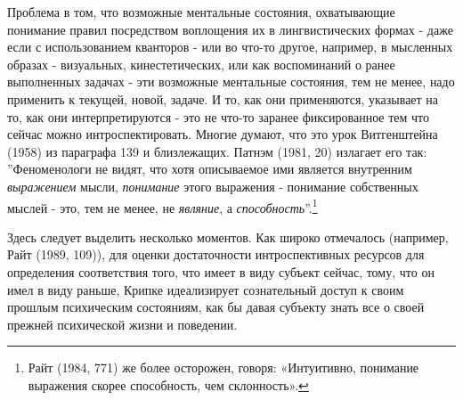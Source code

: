 \documentclass[12pt]{book}
\begin{document}
Проблема в том, что возможные ментальные состояния, охватывающие понимание правил посредством воплощения их в лингвистических формах - даже если с использованием кванторов - или во что-то другое, например, в мысленных образах - визуальных, кинестетических, или как воспоминаний о ранее выполненных задачах - эти возможные ментальные состояния, тем не менее, надо применить к текущей, новой, задаче. И то, как они применяются, указывает на то, как они интерпретируются - это не что-то заранее фиксированное тем что сейчас можно интроспектировать. Многие думают, что это урок Витгенштейна (1958) из параграфа 139 и близлежащих. Патнэм (1981, 20) излагает его так: ''Феноменологи не видят, что хотя описываемое ими является внутренним \textit{выражением} мысли, \textit{понимание} этого выражения - понимание собственных мыслей - это, тем не менее, не \textit{являние}, а \textit{способность}''.\footnote{Райт (1984, 771) же более осторожен, говоря: «Интуитивно, понимание выражения скорее способность, чем склонность».}

Здесь следует выделить несколько моментов. Как широко отмечалось (например, Райт (1989, 109)), для оценки достаточности интроспективных ресурсов для определения соответствия того, что имеет в виду субъект сейчас, тому, что он имел в виду раньше, Крипке идеализирует сознательный доступ к своим прошлым психическим состояниям, как бы давая субъекту знать все о своей прежней психической жизни и поведении.
\end{document}
